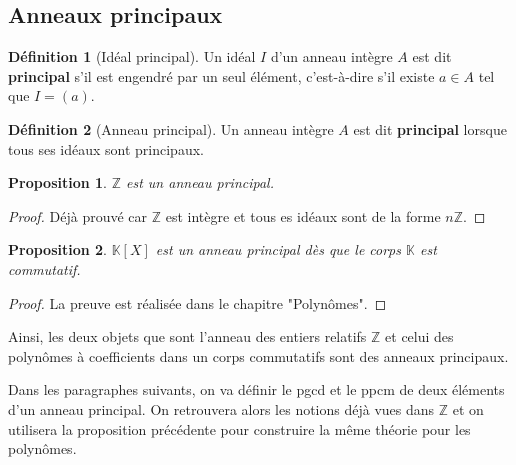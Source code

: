 \documentclass[french]{book}
\newcommand{\Z}{\mathbb{Z}}
\newcommand{\K}{\mathbb{K}}
\theoremstyle{plain}
\newtheorem{prop}{Proposition}[chapter]
\theoremstyle{definition}
\newtheorem{dfn}{Définition}[chapter]
\theoremstyle{remark}
\begin{document}
\subsection{Anneaux principaux}
\begin{dfn}[Idéal principal]
	Un idéal $I$ d'un anneau intègre $A$ est dit \textbf{principal} s'il est engendré par un seul élément, c'est-à-dire s'il existe $a\in A$ tel que $I=(a)$.
\end{dfn}
\begin{dfn}[Anneau principal]
	Un anneau intègre $A$ est dit \textbf{principal} lorsque tous ses idéaux sont principaux.
\end{dfn}
\begin{prop}
	$\Z$ est un anneau principal.
\end{prop}
\begin{proof}
	Déjà prouvé car $\Z$ est intègre et tous es idéaux sont de la forme $n\Z$.
\end{proof}
\begin{prop}
	$\K[X]$ est un anneau principal dès que le corps $\K$ est commutatif.
\end{prop}
\begin{proof}
	La preuve est réalisée dans le chapitre "Polynômes". 
\end{proof}
Ainsi, les deux objets que sont l'anneau des entiers relatifs $\Z$ et celui des polynômes à coefficients dans un corps commutatifs sont des anneaux principaux. \\ \par Dans les paragraphes suivants, on va définir le pgcd et le ppcm de deux éléments d'un anneau principal. On retrouvera alors les notions déjà vues dans $\Z$ et on utilisera la proposition précédente pour construire la même théorie pour les polynômes.
\end{document}
